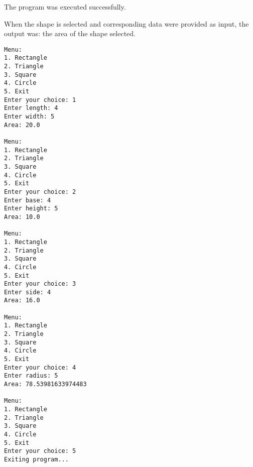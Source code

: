 The program was executed successfully. 

When the shape is selected and corresponding data were provided as input, the output was: the area of the shape selected.
\begin{verbatim}
Menu:
1. Rectangle
2. Triangle
3. Square
4. Circle
5. Exit
Enter your choice: 1
Enter length: 4
Enter width: 5
Area: 20.0

Menu:
1. Rectangle
2. Triangle
3. Square
4. Circle
5. Exit
Enter your choice: 2
Enter base: 4
Enter height: 5
Area: 10.0

Menu:
1. Rectangle
2. Triangle
3. Square
4. Circle
5. Exit
Enter your choice: 3
Enter side: 4
Area: 16.0

Menu:
1. Rectangle
2. Triangle
3. Square
4. Circle
5. Exit
Enter your choice: 4
Enter radius: 5
Area: 78.53981633974483

Menu:
1. Rectangle
2. Triangle
3. Square
4. Circle
5. Exit
Enter your choice: 5
Exiting program...

\end{verbatim}

